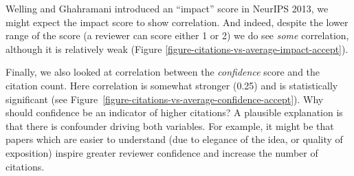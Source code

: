 Welling and Ghahramani introduced an ``impact'' score in NeurIPS 2013,
we might expect the impact score to show correlation. And indeed,
despite the lower range of the score (a reviewer can score either 1 or
2) we do see \emph{some} correlation, although it is relatively weak (Figure \ref{figure-citations-vs-average-impact-accept}).


Finally, we also looked at correlation between the \emph{confidence}
score and the citation count. Here correlation is somewhat stronger (0.25) and is statistically significant (see Figure~\ref{figure-citations-vs-average-confidence-accept}). Why should
confidence be an indicator of higher citations? A plausible explanation
is that there is confounder driving both variables. For example, it
might be that papers which are easier to understand (due to elegance of
the idea, or quality of exposition) inspire greater reviewer confidence
and increase the number of citations.


